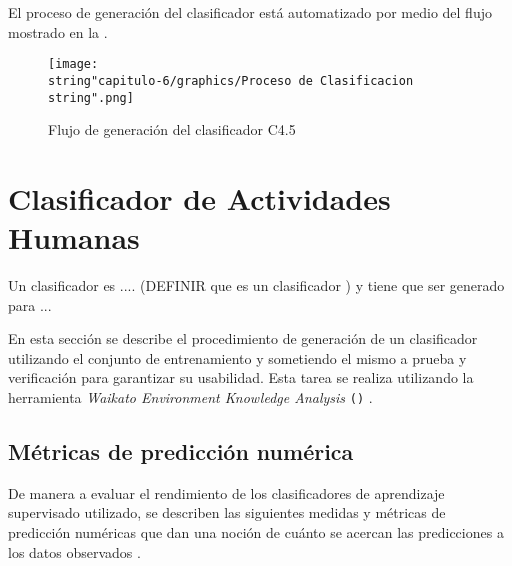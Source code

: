 El proceso de generación del clasificador está automatizado por medio
del flujo mostrado en la .

\begin{figure}[th]
\begin{centering}
\texttt{[image: \\string"capitulo-6/graphics/Proceso de Clasificacion\\string".png]}
\par\end{centering}
\caption{\label{fig6:proceso-clasi}Flujo de generación del clasificador C4.5}
\end{figure}


\section{Clasificador de Actividades Humanas}

\label{sec6:clasificacion}Un clasificador es .... (DEFINIR que es
un clasificador ) y tiene que ser generado para ...

En esta sección se describe el procedimiento de generación de un clasificador
 utilizando el conjunto de entrenamiento y sometiendo el
mismo a prueba y verificación para garantizar su usabilidad. Esta
tarea se realiza utilizando la herramienta \emph{Waikato Environment
Knowledge Analysis} \texttt{()} \cite{Frank2016}. 

\subsection{Métricas de predicción numérica}

De manera a evaluar el rendimiento de los clasificadores de aprendizaje
supervisado utilizado, se describen las siguientes medidas y métricas
de predicción numéricas que dan una noción de cuánto se acercan las
predicciones a los datos observados \cite{Witten2017}.

